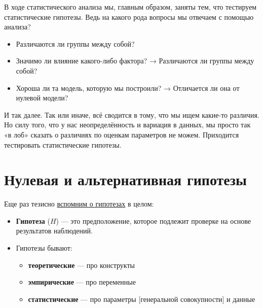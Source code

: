 \documentclass[
  letterpaper,
  DIV=11,
  numbers=noendperiod]{scrreprt}
\providecommand{\tightlist}{%
  \setlength{\itemsep}{0pt}\setlength{\parskip}{0pt}}\usepackage{longtable,booktabs,array}
\newcommand{\vm}[1]{\mathbf{#1}} %
\newcommand{\prob}{\mathbb{P}}
\newcommand{\expect}{\mathbb{E}}
\newcommand{\disp}{\mathbb{D}}
\newcommand{\var}{\mathrm{var}}
\newcommand{\cov}{\mathrm{cov}}
\newcommand{\cor}{\mathrm{cor}}
\newcommand{\se}{\mathrm{se}}
\newcommand{\sd}{\mathrm{sd}}
\newcommand{\iid}{\text{i.i.d}}
\newcommand{\Cline}[2][red]{{\sbox\MBox{$#2$}%
  \rlap{\usebox\MBox}\color{#1}\rule[-1.2\dp\MBox]{\wd\MBox}{0.5pt}}}
\newcommand{\norm}{\mathcal{N}}
\newcommand{\def}{\overset{\text{def}}{=}}
\newcommand{\sgn}{\mathrm{sgn}}
\newcommand{\artanh}{\text{artanh}}
\newcommand{\median}{\mathrm{median}}
\newcommand{\mean}{\mathbb{M}}
\newcommand{\skew}{\mathrm{skew}}
\newcommand{\kurt}{\mathrm{kurt}}
\theoremstyle{definition}
\theoremstyle{remark}
\begin{document}
\newcommand{\vm}[1]{\mathbf{#1}}

\newcommand{\Falg}{\mathcal{F}}
\newcommand{\prob}{\mathbb{P}}
\newcommand{\expect}{\mathbb{E}}
\newcommand{\disp}{\mathbb{D}}
\newcommand{\var}{\text{var}}
\newcommand{\cov}{\text{cov}}
\newcommand{\cor}{\text{cor}}
\newcommand{\se}{\text{se}}
\newcommand{\sd}{\text{sd}}
\newcommand{\iid}{\text{i.i.d}}

\newsavebox{\MBox}
\newcommand{\Cline}[2][red]{{\sbox\MBox{$#2$}%
  \rlap{\usebox\MBox}\color{#1}\rule[-1.2\dp\MBox]{\wd\MBox}{0.5pt}}}

\newcommand{\norm}{\mathcal{N}}

\newcommand{\def}{\overset{\text{def}}{=}}
\newcommand{\sgn}{\text{sgn}}

\usepackage{amsmath}
\DeclareMathOperator\artanh{artanh}

\newcommand{\median}{\text{median}}
\newcommand{\mean}{\mathbb{M}}
\newcommand{\skew}{\mathrm{skew}}
\newcommand{\kurt}{\mathrm{kurt}}

В ходе статистического анализа мы, главным образом, заняты тем, что
тестируем статистические гипотезы. Ведь на какого рода вопросы мы
отвечаем с помощью анализа?

\begin{itemize}
\tightlist
\item
  Различаются ли группы между собой?
\item
  Значимо ли влияние какого-либо фактора? → Различаются ли группы между
  собой?
\item
  Хороша ли та модель, которую мы построили? → Отличается ли она от
  нулевой модели?
\end{itemize}

И так далее. Так или иначе, всё сводится в тому, что мы ищем какие-то
различия. Но силу того, что у нас неопределённость и вариация в данных,
мы просто так «в лоб» сказать о различиях по оценкам параметров не
можем. Приходится тестировать статистические гипотезы.

\section{Нулевая и альтернативная
гипотезы}\label{stats-testing-hyotheses}

Еще раз тезисно \hyperref[stats-hypotheses]{вспомним о гипотезах} в
целом:

\begin{itemize}
\tightlist
\item
  \textbf{Гипотеза} (\(H\)) --- это предположение, которое подлежит
  проверке на основе результатов наблюдений.
\item
  Гипотезы бывают:

  \begin{itemize}
  \tightlist
  \item
    \textbf{теоретические} --- про конструкты
  \item
    \textbf{эмпирические} --- про переменные
  \item
    \textbf{статистические} --- про параметры {[}генеральной
    совокупности{]} и данные
  \end{itemize}
\end{itemize}
\end{document}
